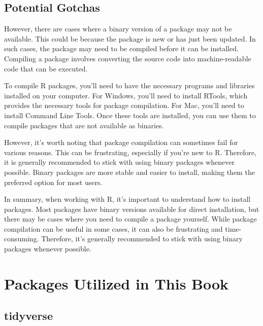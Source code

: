\documentclass[
]{book}
\begin{document}
\hfill\break

\hypertarget{potential-gotchas}{%
\subsection{Potential Gotchas}\label{potential-gotchas}}

However, there are cases where a binary version of a package may not be available. This could be because the package is new or has just been updated. In such cases, the package may need to be compiled before it can be installed. Compiling a package involves converting the source code into machine-readable code that can be executed.

To compile R packages, you'll need to have the necessary programs and libraries installed on your computer. For Windows, you'll need to install RTools, which provides the necessary tools for package compilation. For Mac, you'll need to install Command Line Tools. Once these tools are installed, you can use them to compile packages that are not available as binaries.

However, it's worth noting that package compilation can sometimes fail for various reasons. This can be frustrating, especially if you're new to R. Therefore, it is generally recommended to stick with using binary packages whenever possible. Binary packages are more stable and easier to install, making them the preferred option for most users.

In summary, when working with R, it's important to understand how to install packages. Most packages have binary versions available for direct installation, but there may be cases where you need to compile a package yourself. While package compilation can be useful in some cases, it can also be frustrating and time-consuming. Therefore, it's generally recommended to stick with using binary packages whenever possible.

\hypertarget{packages-utilized-in-this-book}{%
\section{Packages Utilized in This Book}\label{packages-utilized-in-this-book}}

\hypertarget{tidyverse}{%
\subsection*{tidyverse}\label{tidyverse}}
\end{document}
